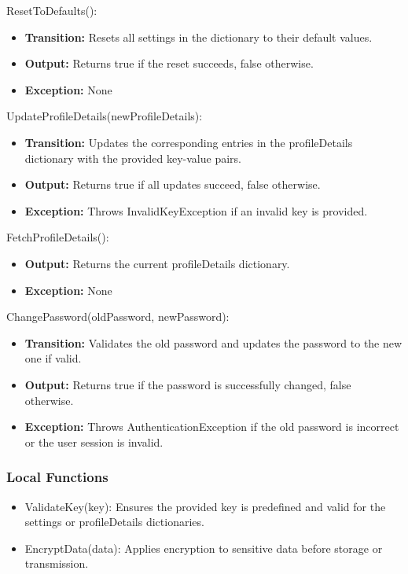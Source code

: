 \documentclass[12pt, titlepage]{article}
\begin{document}
\noindent ResetToDefaults():
\begin{itemize}
    \item \textbf{Transition:} Resets all settings in the dictionary to their default values.
    \item \textbf{Output:} Returns true if the reset succeeds, false otherwise.
    \item \textbf{Exception:} None
\end{itemize}

\noindent UpdateProfileDetails(newProfileDetails):
\begin{itemize}
    \item \textbf{Transition:} Updates the corresponding entries in the profileDetails dictionary with the provided key-value pairs.
    \item \textbf{Output:} Returns true if all updates succeed, false otherwise.
    \item \textbf{Exception:} Throws InvalidKeyException if an invalid key is provided.
\end{itemize}

\noindent FetchProfileDetails():
\begin{itemize}
    \item \textbf{Output:} Returns the current profileDetails dictionary.
    \item \textbf{Exception:} None
\end{itemize}

\noindent ChangePassword(oldPassword, newPassword):
\begin{itemize}
    \item \textbf{Transition:} Validates the old password and updates the password to the new one if valid.
    \item \textbf{Output:} Returns true if the password is successfully changed, false otherwise.
    \item \textbf{Exception:} Throws AuthenticationException if the old password is incorrect or the user session is invalid.
\end{itemize}

\subsubsection{Local Functions}

\begin{itemize}
    \item ValidateKey(key): Ensures the provided key is predefined and valid for the settings or profileDetails dictionaries.
    \item EncryptData(data): Applies encryption to sensitive data before storage or transmission.
\end{itemize}
\end{document}
